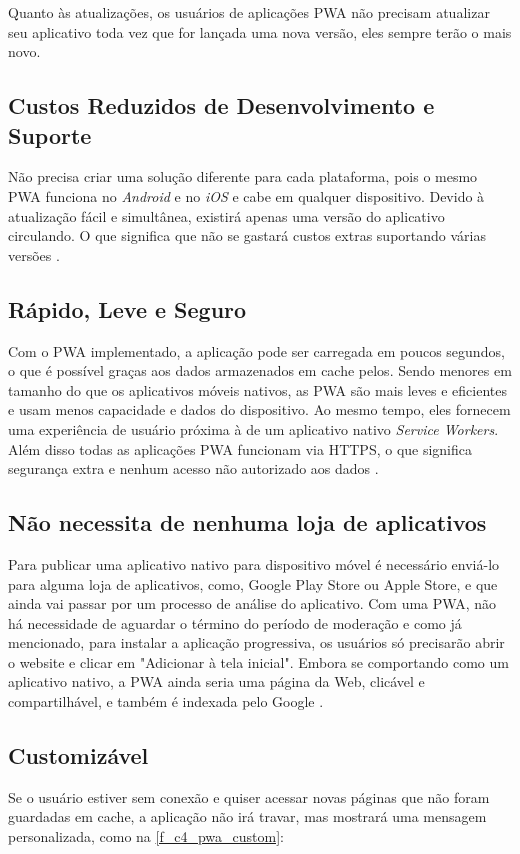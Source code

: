 Quanto às atualizações, os usuários de aplicações \ac{PWA} não precisam atualizar seu aplicativo toda vez que for lançada uma nova versão, eles sempre terão o mais novo.

\subsection{Custos Reduzidos de Desenvolvimento e Suporte}
Não precisa criar uma solução diferente para cada plataforma, pois o mesmo \ac{PWA} funciona no \textit{Android} e no \textit{iOS} e cabe em qualquer dispositivo. Devido à atualização fácil e simultânea, existirá apenas uma versão do aplicativo circulando. O que significa que não se gastará custos extras suportando várias versões \cite{pwabenefits}.

\subsection{Rápido, Leve e Seguro}
Com o \ac{PWA} implementado, a aplicação pode ser carregada em poucos segundos, o que é possível graças aos dados armazenados em cache pelos. Sendo menores em tamanho do que os aplicativos móveis nativos, as \ac{PWA} são mais leves e eficientes e usam menos capacidade e dados do dispositivo. Ao mesmo tempo, eles fornecem uma experiência de usuário próxima à de um aplicativo nativo \textit{Service Workers}. Além disso todas as aplicações \ac{PWA} funcionam via HTTPS, o que significa segurança extra e nenhum acesso não autorizado aos dados \cite{pwa2}.

\subsection{Não necessita de nenhuma loja de aplicativos}
Para publicar uma aplicativo nativo para dispositivo móvel é necessário enviá-lo para alguma loja de aplicativos, como, Google Play Store ou Apple Store, e que ainda vai passar por um processo de análise do aplicativo. Com uma \ac{PWA}, não há necessidade de aguardar o término do período de moderação e como já mencionado, para instalar a aplicação progressiva, os usuários só precisarão abrir o website e clicar em "Adicionar à tela inicial". Embora se comportando como um aplicativo nativo, a \ac{PWA} ainda seria uma página da Web, clicável e compartilhável, e também é indexada pelo Google \cite{pwabenefits}.

\subsection{Customizável}
Se o usuário estiver sem conexão e quiser acessar novas páginas que não foram guardadas em cache, a aplicação não irá travar, mas mostrará uma mensagem personalizada, como na \autoref{f_c4_pwa_custom}:

